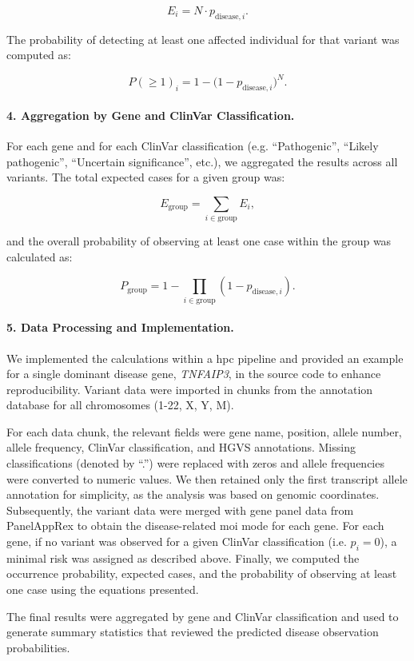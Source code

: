 \[
E_i = N \cdot p_{\text{disease},i}.
\]

The probability of detecting at least one affected individual for that variant was computed as:

\[
P(\geq 1)_i = 1 - \bigl(1 - p_{\text{disease},i}\bigr)^N.
\]

\paragraph{4. Aggregation by Gene and ClinVar Classification.}
For each gene and for each ClinVar classification (e.g. ``Pathogenic'', ``Likely pathogenic'', ``Uncertain significance'', etc.), we aggregated the results across all variants. The total expected cases for a given group was:

\[
E_{\text{group}} = \sum_{i \in \text{group}} E_i,
\]

and the overall probability of observing at least one case within the group was calculated as:

\[
P_{\text{group}} = 1 - \prod_{i \in \text{group}} \left(1 - p_{\text{disease},i}\right).
\]

\paragraph{5. Data Processing and Implementation.}
We implemented the calculations within a \ac{hpc} pipeline and provided an example for a single dominant disease gene, \textit{TNFAIP3}, in the source code to enhance reproducibility. Variant data were imported in chunks from the annotation database for all chromosomes (1-22, X, Y, M). 

For each data chunk, the relevant fields were gene name, position, allele number, allele frequency, ClinVar classification, and HGVS annotations. Missing classifications (denoted by ``.'') were replaced with zeros and allele frequencies were converted to numeric values. We then retained only the first transcript allele annotation for simplicity, as the analysis was based on genomic coordinates. Subsequently, the variant data were merged with gene panel data from PanelAppRex to obtain the disease-related \ac{moi} mode for each gene. For each gene, if no variant was observed for a given ClinVar classification (i.e. \(p_i = 0\)), a minimal risk was assigned as described above. Finally, we computed the occurrence probability, expected cases, and the probability of observing at least one case using the equations presented.

The final results were aggregated by gene and ClinVar classification and used to generate summary statistics that reviewed the predicted disease observation probabilities.




